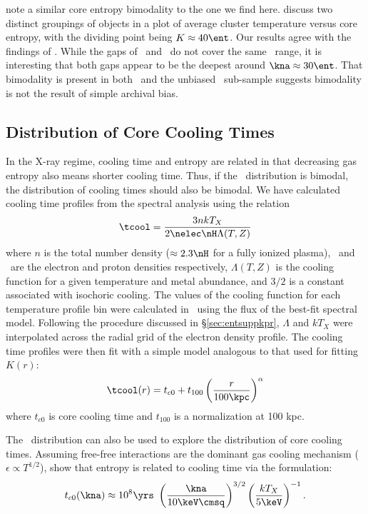 \citet{2007hvcg.conf...42H} note a similar core entropy bimodality to
the one we find here. \citet{2007hvcg.conf...42H} discuss two distinct
groupings of objects in a plot of average cluster temperature versus
core entropy, with the dividing point being $K \approx 40 \ent$. Our
results agree with the findings of \citet{2007hvcg.conf...42H}. While
the gaps of \accept\ and \hifl\ do not cover the same \kna\ range, it
is interesting that both gaps appear to be the deepest around $\kna
\approx 30 \ent$. That bimodality is present in both \accept\ and the
unbiased \hifl\ sub-sample suggests bimodality is not the result of
simple archival bias.

\subsection{Distribution of Core Cooling Times}
\label{sec:entsupphifl}

In the X-ray regime, cooling time and entropy are related in that
decreasing gas entropy also means shorter cooling time. Thus, if the
\kna\ distribution is bimodal, the distribution of cooling times
should also be bimodal. We have calculated cooling time profiles from
the spectral analysis using the relation
\begin{equation}
\tcool = \frac{3nkT_X}{2\nelec \nH \Lambda(T,Z)}
\label{eqn:tcool}
\end{equation}
where $n$ is the total number density ($\approx 2.3\nH$ for a fully
ionized plasma), \nelec\ and \nH\ are the electron and proton
densities respectively, $\Lambda(T,Z)$ is the cooling function for a
given temperature and metal abundance, and $3/2$ is a constant
associated with isochoric cooling. The values of the cooling function
for each temperature profile bin were calculated in \xspec\ using the
flux of the best-fit spectral model. Following the procedure discussed
in \S\ref{sec:entsuppkpr}, $\Lambda$ and $kT_X$ were interpolated across the
radial grid of the electron density profile. The cooling time profiles
were then fit with a simple model analogous to that used for fitting
$K(r)$:
\begin{equation}
\tcool(r) = t_{c0} + t_{100} \left(\frac{r}{100 \kpc}\right)^{\alpha}
\label{eqn:tc0}
\end{equation}
where $t_{c0}$ is core cooling time and $t_{100}$ is a normalization
at 100 kpc.

The \kna\ distribution can also be used to explore the distribution of
core cooling times. Assuming free-free interactions are the dominant
gas cooling mechanism (\ie\ $\epsilon \propto T^{1/2}$),
\citet{radioquiet} show that entropy is related to cooling time via
the formulation:
\begin{equation}
t_{c0}(\kna) \approx 10^8 \yrs\ \left(\frac{\kna}{10 \keV \cmsq}\right)^{3/2} \left(\frac{kT_X}{5 \keV}\right)^{-1}.
\label{eqn:tck0}
\end{equation}

